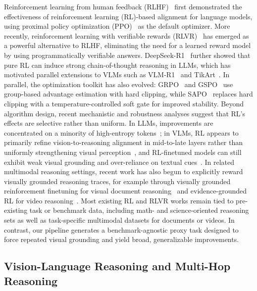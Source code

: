 Reinforcement learning from human feedback (RLHF)~ first demonstrated the effectiveness of reinforcement learning (RL)-based alignment for language models, using proximal policy optimization (PPO)~ as the default optimizer.
More recently, reinforcement learning with verifiable rewards (RLVR)~ has emerged as a powerful alternative to RLHF, eliminating the need for a learned reward model by using programmatically verifiable answers.
DeepSeek-R1~ further showed that pure RL can induce strong chain-of-thought reasoning in LLMs, which has motivated parallel extensions to VLMs such as VLM-R1~ and TikArt~.
In parallel, the optimization toolkit has also evolved: GRPO~ and GSPO~ use group-based advantage estimation with hard clipping, while SAPO~ replaces hard clipping with a temperature-controlled soft gate for improved stability.
Beyond algorithm design, recent mechanistic and robustness analyses suggest that RL's effects are selective rather than uniform. In LLMs, improvements are concentrated on a minority of high-entropy tokens~; in VLMs, RL appears to primarily refine vision-to-reasoning alignment in mid-to-late layers rather than uniformly strengthening visual perception~, and RL-finetuned models can still exhibit weak visual grounding and over-reliance on textual cues~.
In related multimodal reasoning settings, recent work has also begun to explicitly reward visually grounded reasoning traces, for example through visually grounded reinforcement finetuning for visual document reasoning~ and evidence-grounded RL for video reasoning~.
Most existing RL and RLVR works remain tied to pre-existing task or benchmark data, including math- and science-oriented reasoning sets as well as task-specific multimodal datasets for documents or videos.
In contrast, our pipeline generates a benchmark-agnostic proxy task designed to force repeated visual grounding and yield broad, generalizable improvements.

\subsection{Vision-Language Reasoning and Multi-Hop Reasoning}

